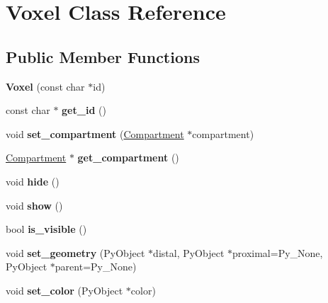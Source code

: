 \hypertarget{classVoxel}{\section{Voxel Class Reference}
\label{classVoxel}
}
\subsection*{Public Member Functions}
\begin{DoxyCompactItemize}
\item 
\hypertarget{classVoxel_a8d82b79d00ae9f6029605d312ab178c7}{{\bfseries Voxel} (const char $\ast$id)}\label{classVoxel_a8d82b79d00ae9f6029605d312ab178c7}

\item 
\hypertarget{classVoxel_a08eb8268674f69f5d6187fe0a89a8158}{const char $\ast$ {\bfseries get\-\_\-id} ()}\label{classVoxel_a08eb8268674f69f5d6187fe0a89a8158}

\item 
\hypertarget{classVoxel_aebd6e95739e95b440cc08d62ce7ce96b}{void {\bfseries set\-\_\-compartment} (\hyperlink{classCompartment}{Compartment} $\ast$compartment)}\label{classVoxel_aebd6e95739e95b440cc08d62ce7ce96b}

\item 
\hypertarget{classVoxel_ab125a4817085bda442ae22713c1d898c}{\hyperlink{classCompartment}{Compartment} $\ast$ {\bfseries get\-\_\-compartment} ()}\label{classVoxel_ab125a4817085bda442ae22713c1d898c}

\item 
\hypertarget{classVoxel_a8d78a6c3090d280ad18647e0152fd8e1}{void {\bfseries hide} ()}\label{classVoxel_a8d78a6c3090d280ad18647e0152fd8e1}

\item 
\hypertarget{classVoxel_a27b81d57c913bb25de47499de667ee0e}{void {\bfseries show} ()}\label{classVoxel_a27b81d57c913bb25de47499de667ee0e}

\item 
\hypertarget{classVoxel_afa7b4f931236036eb814431c45972502}{bool {\bfseries is\-\_\-visible} ()}\label{classVoxel_afa7b4f931236036eb814431c45972502}

\item 
\hypertarget{classVoxel_a045e38b04d04e42ef2ec80de1101f261}{void {\bfseries set\-\_\-geometry} (Py\-Object $\ast$distal, Py\-Object $\ast$proximal=Py\-\_\-\-None, Py\-Object $\ast$parent=Py\-\_\-\-None)}\label{classVoxel_a045e38b04d04e42ef2ec80de1101f261}

\item 
\hypertarget{classVoxel_ad71dda7683ac7ca9f19c286eee3a4fc8}{void {\bfseries set\-\_\-color} (Py\-Object $\ast$color)}\label{classVoxel_ad71dda7683ac7ca9f19c286eee3a4fc8}

\end{DoxyCompactItemize}
